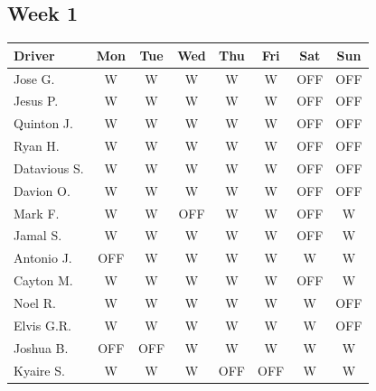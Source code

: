 \documentclass[11pt]{article}
\begin{document}
\subsection{Week 1}
\label{sec:org75f85a5}
\begin{center}
\begin{tabular}{l c c c c c c c}
\toprule
Driver & Mon & Tue & Wed & Thu & Fri & Sat & Sun\\
\midrule
Jose G. & W & W & W & W & W & OFF & OFF\\
Jesus P. & W & W & W & W & W & OFF & OFF\\
Quinton J. & W & W & W & W & W & OFF & OFF\\
Ryan H. & W & W & W & W & W & OFF & OFF\\
Datavious S. & W & W & W & W & W & OFF & OFF\\
Davion O. & W & W & W & W & W & OFF & OFF\\
Mark F. & W & W & OFF & W & W & OFF & W\\
Jamal S. & W & W & W & W & W & OFF & W\\
Antonio J. & OFF & W & W & W & W & W & W\\
Cayton M. & W & W & W & W & W & OFF & W\\
Noel R. & W & W & W & W & W & W & OFF\\
Elvis G.R. & W & W & W & W & W & W & OFF\\
Joshua B. & OFF & OFF & W & W & W & W & W\\
Kyaire S. & W & W & W & OFF & OFF & W & W\\
\bottomrule
\end{tabular}
\end{center}

\vspace{1em}
\end{document}
